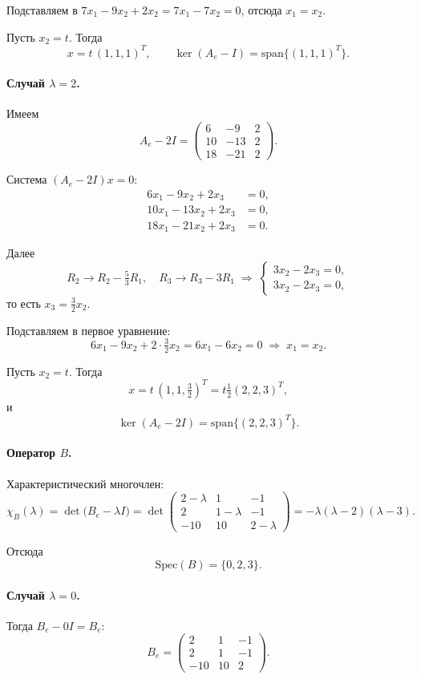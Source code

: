 \documentclass[12pt]{article}
\begin{document}
Подставляем в \(7x_1 -9x_2 +2x_2=7x_1 -7x_2=0\), отсюда \(x_1 = x_2\).

Пусть \(x_2=t\). Тогда
\[
	x = t\,(1,1,1)^T,
	\qquad
	\ker(A_e - I) = \mathrm{span}\{(1,1,1)^T\}.
\]

\paragraph*{Случай \(\lambda=2\).}
Имеем
\[
	A_e - 2I =
	\begin{pmatrix}
		6  & -9  & 2 \\
		10 & -13 & 2 \\
		18 & -21 & 2
	\end{pmatrix}.
\]

Система \((A_e - 2I)x=0\):
\[
	\begin{aligned}
		6x_1 - 9x_2 + 2x_3  & = 0, \\
		10x_1 -13x_2 + 2x_3 & = 0, \\
		18x_1 -21x_2 + 2x_3 & = 0.
	\end{aligned}
\]

Далее
\[
	R_2 \to R_2 - \tfrac{5}{3}R_1,\quad
	R_3 \to R_3 - 3R_1
	\;\Longrightarrow\;
	\begin{cases}
		3x_2 - 2x_3 = 0, \\
		3x_2 - 2x_3 = 0,
	\end{cases}
\]
то есть \(x_3 = \tfrac{3}{2}x_2\).

Подставляем в первое уравнение:
\[
	6x_1 -9x_2 +2\cdot\tfrac{3}{2}x_2
	=6x_1 -6x_2=0
	\;\Longrightarrow\;
	x_1 = x_2.
\]

Пусть \(x_2=t\). Тогда
\[
	x = t\,(1,1,\tfrac32)^T
	= t\tfrac12(2,2,3)^T,
\]
и
\[
	\ker(A_e - 2I)=\mathrm{span}\{(2,2,3)^T\}.
\]

\paragraph*{Оператор \(B\).}

Характеристический многочлен:
\[
	\chi_B(\lambda)
	=\det\bigl(B_e-\lambda I\bigr)
	=\det
	\begin{pmatrix}
		2-\lambda & 1         & -1        \\
		2         & 1-\lambda & -1        \\
		-10       & 10        & 2-\lambda
	\end{pmatrix}
	= -\lambda(\lambda-2)(\lambda-3).
\]

Отсюда
\[
	\mathrm{Spec}(B)=\{0,2,3\}.
\]

\paragraph*{Случай \(\lambda=0\).}
Тогда \(B_e - 0I = B_e\):
\[
	B_e =
	\begin{pmatrix}
		2   & 1  & -1 \\
		2   & 1  & -1 \\
		-10 & 10 & 2
	\end{pmatrix}.
\]
\end{document}
